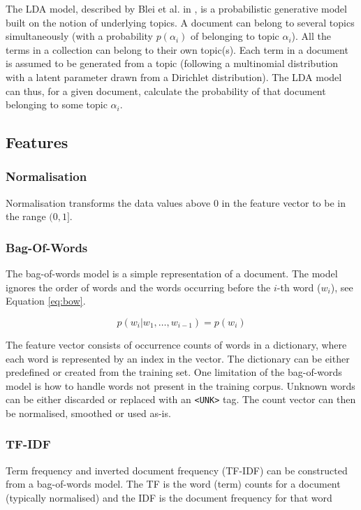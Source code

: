 The LDA model, described by Blei et al. in \cite{Blei2003}, is a probabilistic generative model built on the notion of underlying topics.
A document can belong to several topics simultaneously (with a probability $p(\alpha_i)$ of belonging to topic $\alpha_i$).
All the terms in a collection can belong to their own topic(s).
Each term in a document is assumed to be generated from a topic (following a multinomial distribution with a latent parameter drawn from a Dirichlet distribution).
The LDA model can thus, for a given document, calculate the probability of that document belonging to some topic $\alpha_i$.

\subsection{Features} \label{sec:theory-features}

\subsubsection{Normalisation}
Normalisation transforms the data values above $0$ in the feature vector to be in the range $(0, 1]$.

\subsubsection{Bag-Of-Words} \label{sec:theory-bow}
The bag-of-words model is a simple representation of a document.
The model ignores the order of words and the words occurring before the $i$-th word ($w_i$), see Equation \ref{eq:bow}.

\begin{equation} \label{eq:bow}
    p(w_i|w_1, \ldots, w_{i-1}) = p(w_i)
\end{equation}

The feature vector consists of occurrence counts of words in a dictionary, where each word is represented by an index in the vector.
The dictionary can be either predefined or created from the training set.
One limitation of the bag-of-words model is how to handle words not present in the training corpus.
Unknown words can be either discarded or replaced with an \texttt{<UNK>} tag.
The count vector can then be normalised, smoothed or used as-is.

\subsubsection{TF-IDF}
Term frequency and inverted document frequency (TF-IDF) can be constructed from a bag-of-words model.
The TF is the word (term) counts for a document (typically normalised) and the IDF is the document frequency for that word

